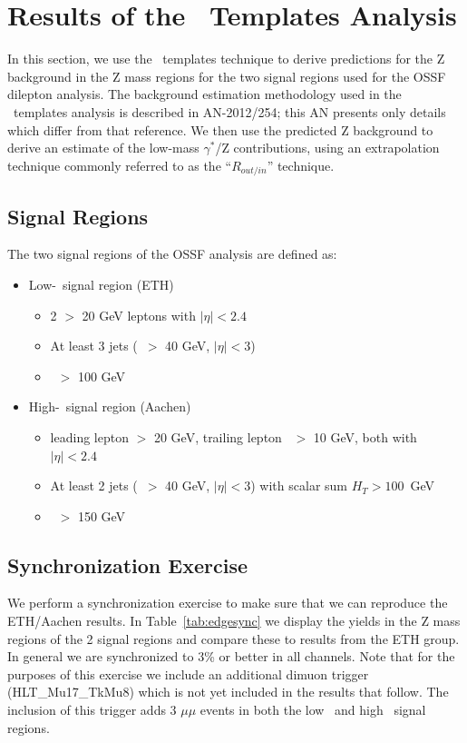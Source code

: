 \section{Results of the \MET\ Templates Analysis}
\label{sec:templates}

In this section, we use the \MET\ templates technique to derive predictions for the Z background in the Z mass regions for the 
two signal regions used for the OSSF dilepton analysis. The background estimation methodology used in the \MET\ templates analysis
is described in AN-2012/254; this AN presents only details which differ from that reference. 
We then use the predicted Z background to derive an estimate of the low-mass $\gamma^*$/Z contributions, 
using an extrapolation technique commonly referred to as the ``$R_{out/in}$'' technique.

\subsection{Signal Regions}

The two signal regions of the OSSF analysis are defined as:

\begin{itemize}
\item Low-\MET\ signal region (ETH)
  \begin{itemize}
  \item 2 \pt $>$ 20 GeV leptons with $|\eta|<2.4$
  \item At least 3 jets (\pt\ $>$ 40 GeV, $|\eta|<3$)
  \item \MET\ $>$ 100 GeV
  \end{itemize}
\item High-\MET\ signal region (Aachen)
  \begin{itemize}
  \item leading lepton \pt $>$ 20 GeV, trailing lepton \pt\ $>$ 10 GeV, both with $|\eta|<2.4$
  \item At least 2 jets (\pt\ $>$ 40 GeV, $|\eta|<3$) with scalar sum $H_{T}>100$~GeV
  \item \MET\ $>$ 150 GeV
  \end{itemize}
\end{itemize}

\subsection{Synchronization Exercise}

We perform a synchronization exercise to make sure that we can reproduce the ETH/Aachen results. In Table~\ref{tab:edgesync} we
display the yields in the Z mass regions of the 2 signal regions and compare these to results from the ETH group.
In general we are synchronized to 3\% or better in all channels. Note that for the purposes of this exercise we include an additional
dimuon trigger (HLT\_Mu17\_TkMu8) which is not yet included in the results that follow. The inclusion of this trigger adds 3 $\mu\mu$
events in both  the low \MET\ and high \MET\ signal regions.

